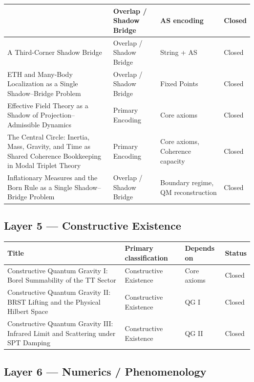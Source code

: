 \documentclass[11pt]{article}
\begin{document}
\begin{center}
\begin{tabular}{|p{7.2cm}|p{3.6cm}|p{3.6cm}|p{1.6cm}|}
& Overlap / Shadow Bridge & AS encoding & Closed\\
\hline
A Third-Corner Shadow Bridge
& Overlap / Shadow Bridge & String + AS & Closed\\
\hline
ETH and Many-Body Localization as a Single Shadow--Bridge Problem
& Overlap / Shadow Bridge & Fixed Points & Closed\\
\hline
Effective Field Theory as a Shadow of Projection--Admissible Dynamics &
Primary Encoding & Core axioms & Closed \\
\hline
The Central Circle: Inertia, Mass, Gravity, and Time as Shared Coherence
Bookkeeping in Modal Triplet Theory
& Primary Encoding
& Core axioms, Coherence capacity
& Closed \\
\hline
Inflationary Measures and the Born Rule as a Single Shadow–Bridge Problem
& Overlap / Shadow Bridge & Boundary regime, QM reconstruction & Closed \\
\hline
\end{tabular}
\end{center}

\subsection{Layer 5 --- Constructive Existence}

\begin{center}
\small
\begin{tabular}{|p{7.2cm}|p{3.6cm}|p{3.6cm}|p{1.6cm}|}
\hline
\textbf{Title} & \textbf{Primary classification} & \textbf{Depends on} & \textbf{Status}\\
\hline
Constructive Quantum Gravity I: Borel Summability of the TT Sector
& Constructive Existence & Core axioms & Closed\\
\hline
Constructive Quantum Gravity II: BRST Lifting and the Physical Hilbert Space
& Constructive Existence & QG I & Closed\\
\hline
Constructive Quantum Gravity III: Infrared Limit and Scattering under SPT Damping
& Constructive Existence & QG II & Closed\\
\hline
\end{tabular}
\end{center}

\subsection{Layer 6 --- Numerics / Phenomenology}
\end{document}
